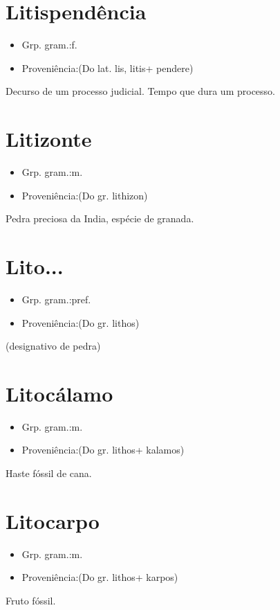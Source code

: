 \section{Litispendência}
\begin{itemize}
\item {Grp. gram.:f.}
\end{itemize}
\begin{itemize}
\item {Proveniência:(Do lat. \textunderscore lis\textunderscore , \textunderscore litis\textunderscore  + \textunderscore pendere\textunderscore )}
\end{itemize}
Decurso de um processo judicial.
Tempo que dura um processo.
\section{Litizonte}
\begin{itemize}
\item {Grp. gram.:m.}
\end{itemize}
\begin{itemize}
\item {Proveniência:(Do gr. \textunderscore lithizon\textunderscore )}
\end{itemize}
Pedra preciosa da India, espécie de granada.
\section{Lito...}
\begin{itemize}
\item {Grp. gram.:pref.}
\end{itemize}
\begin{itemize}
\item {Proveniência:(Do gr. \textunderscore lithos\textunderscore )}
\end{itemize}
(designativo de \textunderscore pedra\textunderscore )
\section{Litocálamo}
\begin{itemize}
\item {Grp. gram.:m.}
\end{itemize}
\begin{itemize}
\item {Proveniência:(Do gr. \textunderscore lithos\textunderscore  + \textunderscore kalamos\textunderscore )}
\end{itemize}
Haste fóssil de cana.
\section{Litocarpo}
\begin{itemize}
\item {Grp. gram.:m.}
\end{itemize}
\begin{itemize}
\item {Proveniência:(Do gr. \textunderscore lithos\textunderscore  + \textunderscore karpos\textunderscore )}
\end{itemize}
Fruto fóssil.
